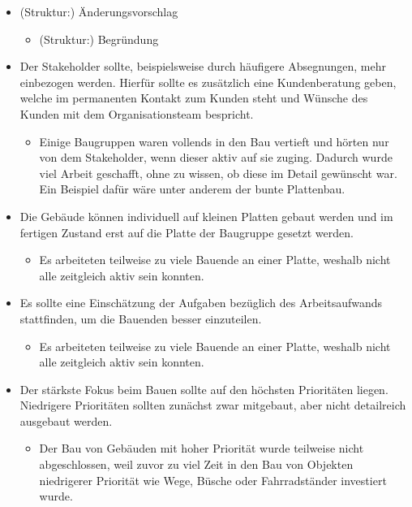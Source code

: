 \documentclass[a4paper, 11pt]{article}
\begin{document}
\begin{itemize}
    \item (Struktur:) Änderungsvorschlag
    \begin{itemize}
        \item[\ding{227}] (Struktur:) Begründung
    \end{itemize}
    \item Der Stakeholder sollte, beispielsweise durch häufigere Absegnungen, mehr einbezogen werden. Hierfür sollte es zusätzlich eine Kundenberatung geben, welche im permanenten Kontakt zum Kunden steht und Wünsche des Kunden mit dem Organisationsteam bespricht.
    \begin{itemize}
        \item[\ding{227}] Einige Baugruppen waren vollends in den Bau vertieft und hörten nur von dem Stakeholder, wenn dieser aktiv auf sie zuging. Dadurch wurde viel Arbeit geschafft, ohne zu wissen, ob diese im Detail gewünscht war. Ein Beispiel dafür wäre unter anderem der bunte Plattenbau.
    \end{itemize}
    \item Die Gebäude können individuell auf kleinen Platten gebaut werden und im fertigen Zustand erst auf die Platte der Baugruppe gesetzt werden.
    \begin{itemize}
        \item[\ding{227}] Es arbeiteten teilweise zu viele Bauende an einer Platte, weshalb nicht alle zeitgleich aktiv sein konnten.
    \end{itemize}
    \item Es sollte eine Einschätzung der Aufgaben bezüglich des Arbeitsaufwands stattfinden, um die Bauenden besser einzuteilen.
    \begin{itemize}
        \item[\ding{227}] Es arbeiteten teilweise zu viele Bauende an einer Platte, weshalb nicht alle zeitgleich aktiv sein konnten.
    \end{itemize}
    \item Der stärkste Fokus beim Bauen sollte auf den höchsten Prioritäten liegen. Niedrigere Prioritäten sollten zunächst zwar mitgebaut, aber nicht detailreich ausgebaut werden.
    \begin{itemize}
        \item[\ding{227}] Der Bau von Gebäuden mit hoher Priorität wurde teilweise nicht abgeschlossen, weil zuvor zu viel Zeit in den Bau von Objekten niedrigerer Priorität wie Wege, Büsche oder Fahrradständer investiert wurde.
    \end{itemize}

\end{itemize}
\end{document}
